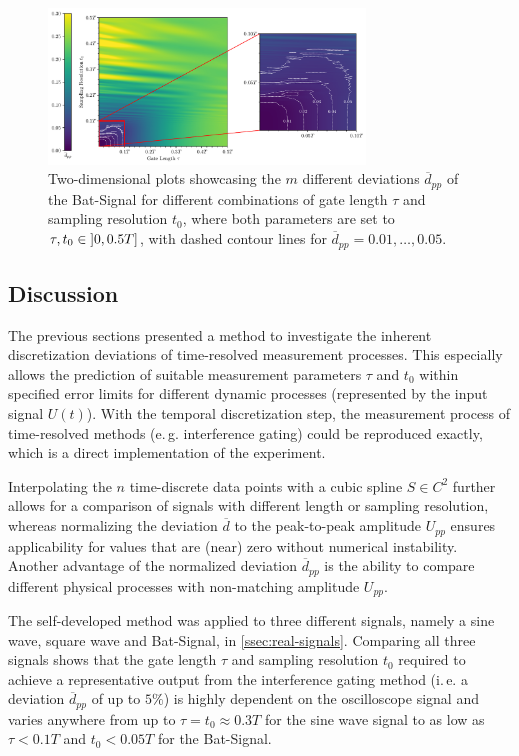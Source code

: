 \begin{figure}[H]
	\centering
		\centering
	\includegraphics[width=0.75\textwidth]{Figures/Combinations/batman_real.pdf}
	\caption{Two-dimensional plots showcasing the $m$ different deviations $\overline{d}_{pp}$ of the Bat-Signal for different combinations of gate length $\tau$ and sampling resolution $t_0$, where both parameters are set to $\tau, t_0 \in \interval[scaled, open left]{0}{0.5T}$, with dashed contour lines for $\overline{d}_{pp} = 0.01, \dotsc ,0.05$.}
	\label{fig:batman-real-combination}
\end{figure}
\subsection{Discussion} \label{ssec:implementation-discussion}
The previous sections presented a method to investigate the inherent discretization deviations of time-resolved measurement processes. This especially allows the prediction of suitable measurement parameters $\tau$ and $t_0$ within specified error limits for different dynamic processes (represented by the input signal $U\left(t\right)$). With the temporal discretization step, the measurement process of time-resolved methods (e.\,g. interference gating) could be reproduced exactly, which is a direct implementation of the experiment.

Interpolating the $n$ time-discrete data points with a cubic spline $S \in C^2$ further allows for a comparison of signals with different length or sampling resolution, whereas normalizing the deviation $\overline{d}$ to the peak-to-peak amplitude $U_{pp}$ ensures applicability for values that are (near) zero without numerical instability. Another advantage of the normalized deviation $\overline{d}_{pp}$ is the ability to compare different physical processes with non-matching amplitude $U_{pp}$.

The self-developed method was applied to three different signals, namely a sine wave, square wave and Bat-Signal, in \cref{ssec:real-signals}. Comparing all three signals shows that the gate length $\tau$ and sampling resolution $t_0$ required to achieve a representative output from the interference gating method (i.\,e. a deviation $\overline{d}_{pp}$ of up to $5\%$) is highly dependent on the oscilloscope signal and varies anywhere from up to $\tau = t_0 \approx 0.3T$ for the sine wave signal to as low as $\tau < 0.1T$ and $t_0 < 0.05T$ for the Bat-Signal.

